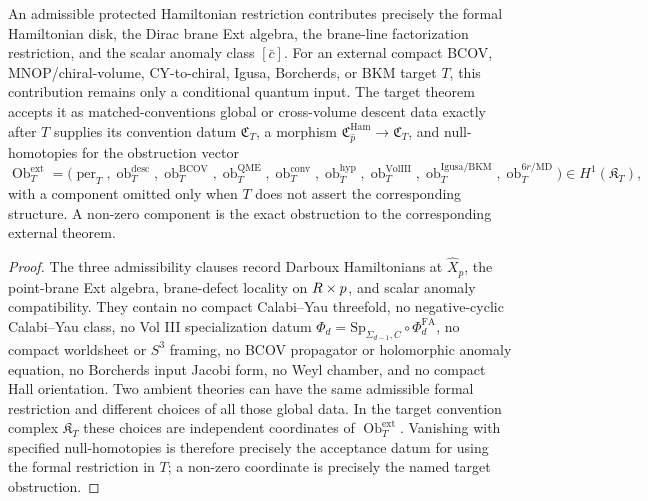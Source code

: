 \begin{lem}\label{lem:admissibility-not-globalization}
  An admissible protected Hamiltonian restriction contributes precisely
  the formal Hamiltonian disk, the Dirac brane Ext algebra, the brane-line
  factorization restriction, and the scalar anomaly class \( [\bar c] \).
  For an external compact BCOV, MNOP/chiral-volume, CY-to-chiral, Igusa,
  Borcherds, or BKM target \(T\), this contribution remains only a
  conditional quantum input.  The target theorem accepts it as
  matched-conventions global or cross-volume descent data exactly after
  \(T\) supplies its convention datum
  \(\mathfrak C_T\), a morphism
  \(\mathfrak C_{\widehat p}^{\mathrm{Ham}}\to \mathfrak C_T\), and
  null-homotopies for the obstruction vector
  \[
    \operatorname{Ob}^{\mathrm{ext}}_T
    =
    \bigl(
      \operatorname{per}_T,
      \operatorname{ob}^{\mathrm{desc}}_T,
      \operatorname{ob}^{\mathrm{BCOV}}_T,
      \operatorname{ob}^{\mathrm{QME}}_T,
      \operatorname{ob}^{\mathrm{conv}}_T,
      \operatorname{ob}^{\mathrm{hyp}}_T,
      \operatorname{ob}^{\mathrm{VolIII}}_T,
      \operatorname{ob}^{\mathrm{Igusa/BKM}}_T,
      \operatorname{ob}^{6r/\mathrm{MD}}_T
    \bigr)
    \in H^1(\mathfrak K_T),
  \]
  with a component omitted only when \(T\) does not assert the
  corresponding structure.  A non-zero component is the exact obstruction
  to the corresponding external theorem.
\end{lem}

\begin{proof}
  The three admissibility clauses record Darboux Hamiltonians at
  \(\widehat X_p\), the point-brane Ext algebra, brane-defect locality on
  \(R\times p\), and scalar anomaly compatibility.  They contain no
  compact Calabi--Yau threefold, no negative-cyclic Calabi--Yau class,
  no Vol III specialization datum
  \(\Phi_d=\mathrm{Sp}_{\Sigma_{d-1},C}\circ\Phi^{\mathrm{FA}}_d\), no
  compact worldsheet or \(S^3\) framing, no BCOV propagator or
  holomorphic anomaly equation, no Borcherds input Jacobi form, no Weyl
  chamber, and no compact Hall orientation.  Two ambient theories can
  have the same admissible formal restriction and different choices of
  all those global data.  In the target convention complex
  \(\mathfrak K_T\) these choices are independent coordinates of
  \(\operatorname{Ob}^{\mathrm{ext}}_T\).  Vanishing with specified
  null-homotopies is therefore precisely the acceptance datum for using
  the formal restriction in \(T\); a non-zero coordinate is precisely the
  named target obstruction.
\end{proof}

